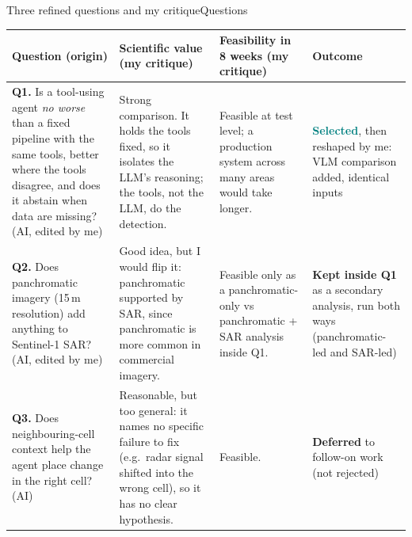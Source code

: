 \documentclass[aspectratio=169,11pt]{beamer}
\begin{document}
\begin{frame}[shrink=14]{Three refined questions and my critique}{Questions}
\scriptsize
\begin{tabularx}{\textwidth}{@{}>{\raggedright\arraybackslash}p{3.4cm}YY>{\raggedright\arraybackslash}p{2.9cm}@{}}
\toprule
\textbf{Question} {\color{muted}(origin)} & \textbf{Scientific value (my critique)} & \textbf{Feasibility in 8 weeks (my critique)} & \textbf{Outcome} \\
\midrule
\textbf{Q1.} Is a tool-using agent \emph{no worse} than a fixed pipeline with the same tools, better where the tools disagree, and does it abstain when data are missing? {\color{muted}(AI, edited by me)}
 & Strong comparison. It holds the tools fixed, so it isolates the LLM's reasoning; the tools, not the LLM, do the detection.
 & Feasible at test level; a production system across many areas would take longer.
 & \textcolor{teal}{\textbf{Selected}}, then reshaped by me: VLM comparison added, identical inputs \\
\addlinespace
\textbf{Q2.} Does panchromatic imagery (15\,m resolution) add anything to Sentinel-1 SAR? {\color{muted}(AI, edited by me)}
 & Good idea, but I would flip it: \alert{panchromatic supported by SAR}, since panchromatic is more common in commercial imagery.
 & Feasible only as a panchromatic-only vs panchromatic + SAR analysis inside Q1.
 & \textcolor{amber}{\textbf{Kept inside Q1}} as a secondary analysis, run both ways (panchromatic-led and SAR-led) \\
\addlinespace
\textbf{Q3.} Does neighbouring-cell context help the agent place change in the right cell? {\color{muted}(AI)}
 & Reasonable, but too general: it names no specific failure to fix (e.g.\ radar signal shifted into the wrong cell), so it has no clear hypothesis.
 & Feasible.
 & \textcolor{muted}{\textbf{Deferred}} to follow-on work (not rejected) \\
\bottomrule
\end{tabularx}
\end{frame}
\end{document}
